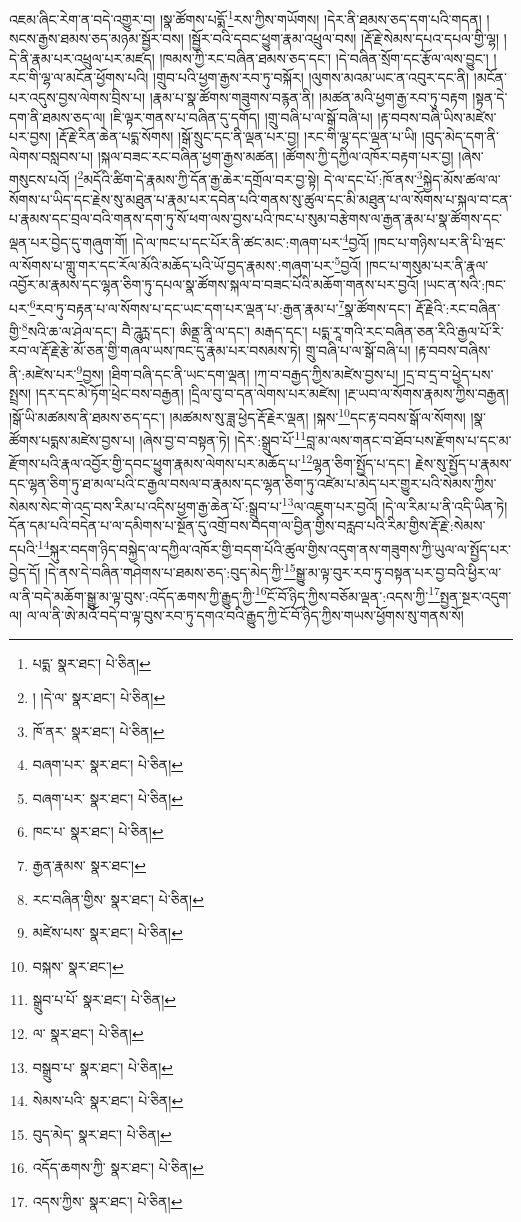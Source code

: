 འཇམ་ཞིང་རེག་ན་བདེ་འགྱུར་བ། །སྣ་ཚོགས་པདྨོ་\footnote{པདྨ་  སྣར་ཐང་།  པེ་ཅིན། }རས་ཀྱིས་གཡོགས། །དེར་ནི་ཐམས་ཅད་དག་པའི་གདན། །སངས་རྒྱས་ཐམས་ཅད་མཉམ་སྦྱོར་བས། །སྦྱོར་བའི་དབང་ཕྱུག་རྣམ་འཕྲུལ་བས། །རྡོ་རྗེ་སེམས་དཔའ་དཔལ་གྱི་ལྷ། །དེ་ནི་རྣམ་པར་འཕྲུལ་པར་མཛད། །ཁམས་ཀྱི་རང་བཞིན་ཐམས་ཅད་དང་། །དེ་བཞིན་སྲོག་དང་རྩོལ་ལས་བྱུང་། །རང་གི་ལྷ་ལ་མངོན་ཕྱོགས་པའི། །གྲུབ་པའི་ཕྱག་རྒྱས་རབ་ཏུ་བསྐོར། །ལུགས་མའམ་ཡང་ན་འབུར་དང་ནི། །མངོན་པར་འདུས་བྱས་ལེགས་བྲིས་པ། །རྣམ་པ་སྣ་ཚོགས་གཟུགས་བརྙན་ནི། །མཚན་མའི་ཕྱག་རྒྱ་རབ་ཏུ་བརྟག །སྟན་དེ་དག་ནི་ཐམས་ཅད་ལ། །ཇི་ལྟར་གནས་པ་བཞིན་དུ་དགོད། །གྲུ་བཞི་པ་ལ་སྒོ་བཞི་པ། །རྟ་བབས་བཞི་ཡིས་མཛེས་པར་བྱས། །རྡོ་རྗེ་རིན་ཆེན་པདྨ་སོགས། །སྒོ་སྲུང་དང་ནི་ལྡན་པར་བྱ། །རང་གི་ལྷ་དང་ལྡན་པ་ཡི། །བུད་མེད་དག་ནི་ལེགས་བསླབས་པ། །སྐལ་བཟང་རང་བཞིན་ཕྱག་རྒྱས་མཚན། །ཚོགས་ཀྱི་དཀྱིལ་འཁོར་བརྟག་པར་བྱ། །ཞེས་གསུངས་པའོ། །\footnote{། །དེ་ལ་  སྣར་ཐང་།  པེ་ཅིན། }མདོའི་ཚིག་དེ་རྣམས་ཀྱི་དོན་རྒྱ་ཆེར་དགྲོལ་བར་བྱ་སྟེ། དེ་ལ་དང་པོ་:ཁོ་ནས་\footnote{ཁོ་ནར་  སྣར་ཐང་།  པེ་ཅིན། }སྐྱེད་མོས་ཚལ་ལ་སོགས་པ་ཡིད་དང་རྗེས་སུ་མཐུན་པ་རྣམ་པར་དབེན་པའི་གནས་སུ་ཚུལ་དང་མི་མཐུན་པ་ལ་སོགས་པ་སྐལ་བ་ངན་པ་རྣམས་དང་བྲལ་བའི་གནས་དག་ཏུ་སོ་ཕག་ལས་བྱས་པའི་ཁང་པ་སུམ་བརྩེགས་ལ་རྒྱན་རྣམ་པ་སྣ་ཚོགས་དང་ལྡན་པར་བྱེད་དུ་གཞུག་གོ། །དེ་ལ་ཁང་པ་དང་པོར་ནི་ཚང་མང་:གཞག་པར་\footnote{བཞག་པར་  སྣར་ཐང་།  པེ་ཅིན། }བྱའོ། །ཁང་པ་གཉིས་པར་ནི་པི་ཝང་ལ་སོགས་པ་གླུ་གར་དང་རོལ་མོའི་མཆོད་པའི་ཡོ་བྱད་རྣམས་:གཞག་པར་\footnote{བཞག་པར་  སྣར་ཐང་།  པེ་ཅིན། }བྱའོ། །ཁང་པ་གསུམ་པར་ནི་རྣལ་འབྱོར་མ་རྣམས་དང་ལྷན་ཅིག་ཏུ་དཔལ་སྣ་ཚོགས་སྐལ་བ་བཟང་པོའི་མཆོག་གནས་པར་བྱའོ། །ཡང་ན་སའི་:ཁང་པར་\footnote{ཁང་པ་  སྣར་ཐང་།  པེ་ཅིན། }རབ་ཏུ་བརྟན་པ་ལ་སོགས་པ་དང་ཡང་དག་པར་ལྡན་པ་:རྒྱན་རྣམ་པ་\footnote{རྒྱན་རྣམས་  སྣར་ཐང་། }སྣ་ཚོགས་དང་། རྡོ་རྗེའི་:རང་བཞིན་གྱི་\footnote{རང་བཞིན་གྱིས་  སྣར་ཐང་།  པེ་ཅིན། }སའི་ཆ་ལ་ཤེལ་དང་། བཻ་ཌཱུཪྻ་དང་། ཨིནྡྲ་ནཱི་ལ་དང་། མརྒད་དང་། པདྨ་རཱ་གའི་རང་བཞིན་ཅན་རིའི་རྒྱལ་པོ་རི་རབ་ལ་རྡོ་རྗེ་རྩེ་མོ་ཅན་གྱི་གཞལ་ཡས་ཁང་དུ་རྣམ་པར་བསམས་ཏེ། གྲུ་བཞི་པ་ལ་སྒོ་བཞི་པ། །རྟ་བབས་བཞིས་ནི་:མཛེས་པར་\footnote{མཛེས་པས་  སྣར་ཐང་།  པེ་ཅིན། }བྱས། །ཐིག་བཞི་དང་ནི་ཡང་དག་ལྡན། །ཀ་བ་བརྒྱད་ཀྱིས་མཛེས་བྱས་པ། །དྲ་བ་དྲ་བ་ཕྱེད་པས་སྤྲས། །དར་དང་མེ་ཏོག་ཕྲེང་བས་བརྒྱན། །དྲིལ་བུ་བ་དན་ལེགས་པར་མཛེས། །རྔ་ཡབ་ལ་སོགས་རྣམས་ཀྱིས་བརྒྱན། །སྒོ་ཡི་མཚམས་ནི་ཐམས་ཅད་དང་། །མཚམས་སུ་ཟླ་ཕྱེད་རྡོ་རྗེར་ལྡན། །སྐས་\footnote{བསྐས་  སྣར་ཐང་། }དང་རྟ་བབས་སྒོ་ལ་སོགས། །སྣ་ཚོགས་པདྨས་མཛེས་བྱས་པ། །ཞེས་བྱ་བ་བསྟན་ཏེ། །དེར་:སྒྲུབ་པོ་\footnote{སྒྲུབ་པ་པོ་  སྣར་ཐང་།  པེ་ཅིན། }བླ་མ་ལས་གནང་བ་ཐོབ་པས་རྫོགས་པ་དང་མ་རྫོགས་པའི་རྣལ་འབྱོར་གྱི་དབང་ཕྱུག་རྣམས་ལེགས་པར་མཆོད་པ་\footnote{ལ་  སྣར་ཐང་།  པེ་ཅིན། }ལྷན་ཅིག་སྤྱོད་པ་དང་། རྗེས་སུ་སྤྱོད་པ་རྣམས་དང་ལྷན་ཅིག་ཏུ་ཐ་མལ་པའི་ང་རྒྱལ་བསལ་བ་རྣམས་དང་ལྷན་ཅིག་ཏུ་འཛེམ་པ་མེད་པར་གྱུར་པའི་སེམས་ཀྱིས་སེམས་སེང་གེ་འདྲ་བས་རིམ་པ་འདིས་ཕྱག་རྒྱ་ཆེན་པོ་:སྒྲུབ་པ་\footnote{བསྒྲུབ་པ་  སྣར་ཐང་།  པེ་ཅིན། }ལ་འཇུག་པར་བྱའོ། །དེ་ལ་རིམ་པ་ནི་འདི་ཡིན་ཏེ། དོན་དམ་པའི་བདེན་པ་ལ་དམིགས་པ་སྔོན་དུ་འགྲོ་བས་བདག་ལ་བྱིན་གྱིས་བརླབ་པའི་རིམ་གྱིས་རྡོ་རྗེ་:སེམས་དཔའི་\footnote{སེམས་པའི་  སྣར་ཐང་།  པེ་ཅིན། }སྐུར་བདག་ཉིད་བསྐྱེད་ལ་དཀྱིལ་འཁོར་གྱི་བདག་པོའི་ཚུལ་གྱིས་འདུག་ནས་གཟུགས་ཀྱི་ཡུལ་ལ་སྤྱོད་པར་བྱེད་དོ། །དེ་ནས་དེ་བཞིན་གཤེགས་པ་ཐམས་ཅད་:བུད་མེད་ཀྱི་\footnote{བུད་མེད་  སྣར་ཐང་།  པེ་ཅིན། }སྒྱུ་མ་ལྟ་བུར་རབ་ཏུ་བསྟན་པར་བྱ་བའི་ཕྱིར་ལ་ལ་ནི་བདེ་མཆོག་སྒྱུ་མ་ལྟ་བུས་:འདོད་ཆགས་ཀྱི་རྒྱུད་ཀྱི་\footnote{འདོད་ཆགས་ཀྱི་  སྣར་ཐང་།  པེ་ཅིན། }ངོ་བོ་ཉིད་ཀྱིས་བཅོམ་ལྡན་:འདས་ཀྱི་\footnote{འདས་ཀྱིས་  སྣར་ཐང་།  པེ་ཅིན། }སྤྱན་སྔར་འདུག་ལ། ལ་ལ་ནི་ཨེ་མའོ་བདེ་བ་ལྟ་བུས་རབ་ཏུ་དགའ་བའི་རྒྱུད་ཀྱི་ངོ་བོ་ཉིད་ཀྱིས་གཡས་ཕྱོགས་སུ་གནས་སོ། 